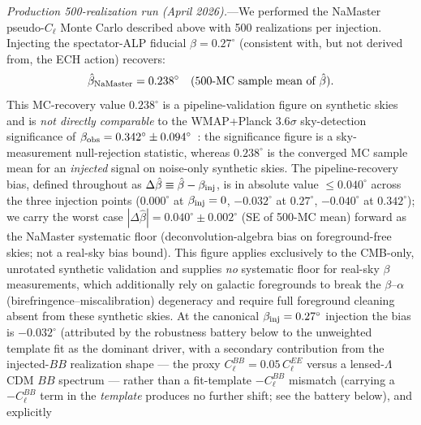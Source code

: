 \documentclass[aps,prd,twocolumn,superscriptaddress,showpacs,preprintnumbers,nofootinbib,longbibliography,floatfix]{revtex4-2}
\begin{document}
\textit{Production 500-realization run (April 2026).}---We
performed the NaMaster pseudo-$C_\ell$ Monte Carlo described above with
500 realizations per injection. Injecting the spectator-ALP fiducial $\beta=0.27^\circ$
(consistent with, but not derived from, the ECH action) recovers:
\begin{equation}
  \hat\beta_{\rm NaMaster} = 0.238^\circ \quad (\text{500-MC sample mean of }\hat\beta).
  \label{eq:beta_namaster}
\end{equation}
This MC-recovery value $0.238^\circ$ is a pipeline-validation figure on
synthetic skies and is \emph{not directly comparable} to the
WMAP+Planck $3.6\sigma$ sky-detection significance of
$\beta_{\rm obs}=0.342^\circ\pm 0.094^\circ$~\cite{Eskilt2022}: the
significance figure is a sky-measurement null-rejection statistic,
whereas $0.238^\circ$ is the converged MC sample mean for an
\emph{injected} signal on noise-only synthetic skies.
The pipeline-recovery bias, defined throughout as
$\Delta\hat\beta \equiv \hat\beta - \beta_{\rm inj}$, is in absolute
value $\le 0.040^\circ$ across the three injection points
($0.000^\circ$ at $\beta_{\rm inj}=0$, $-0.032^\circ$ at $0.27^\circ$,
$-0.040^\circ$ at $0.342^\circ$); we carry the worst case
$|\Delta\hat\beta| = 0.040^\circ\pm 0.002^\circ$ (SE of 500-MC mean) forward as the NaMaster systematic
floor (deconvolution-algebra bias on foreground-free skies; not a real-sky bias bound). This figure applies exclusively to the CMB-only, unrotated synthetic validation and supplies \emph{no} systematic floor for real-sky $\beta$ measurements, which additionally rely on galactic foregrounds to break the $\beta$--$\alpha$ (birefringence--miscalibration) degeneracy and require full foreground cleaning absent from these synthetic skies. At the canonical $\beta_{\rm inj}=0.27^\circ$ injection the bias
is $-0.032^\circ$
(attributed by the robustness battery below to the unweighted template
fit as the dominant driver, with a secondary contribution from the
injected-$BB$ realization shape --- the proxy
$C_\ell^{BB}=0.05\,C_\ell^{EE}$ versus a lensed-$\Lambda$CDM $BB$ spectrum
--- rather than a fit-template $-C_\ell^{BB}$ mismatch (carrying a
$-C_\ell^{BB}$ term in the \emph{template} produces no further shift; see
the battery below), and explicitly
\end{document}
